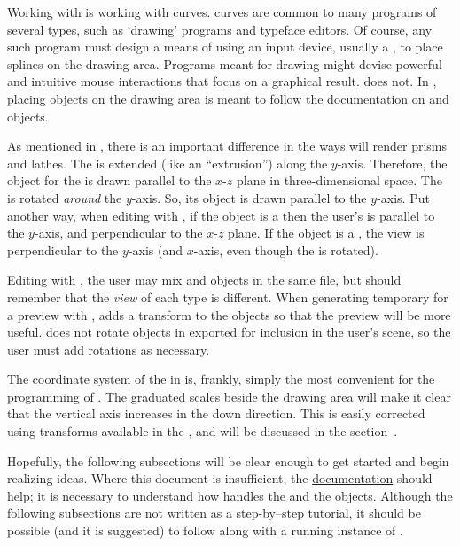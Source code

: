 	Working with \IXpkg{} is working with \IXspline{} curves.
	\IXSpline{} curves are common to many programs of
	several types, such as `drawing' programs and typeface
	editors. Of course, any such program must design a
	means of using an input device, usually a ,
	to place splines on the drawing area. Programs meant
	for drawing might devise powerful and intuitive mouse
	interactions that focus on a graphical result.
	\IXpkgu{} does not. In \IXpkg{}, placing \IXspline{}
	objects on the drawing area is meant to follow the
	\IXpov{} \href{\URLPOVdocs}{documentation}
	on
	\href{\URLPOVdocsLathe}{\IXlathe{}}
	and
	\href{\URLPOVdocsPrism}{\IXprism{}}
	objects.

	As mentioned in ,
	there is an important difference
	in the ways \IXpov{} will render prisms and lathes.
	The \IXprism{} is extended (like an ``extrusion'') along the
	$y$-axis. Therefore, the \IXspline{} object for the \IXprism{}
	is drawn parallel to the $x$-$z$ plane in three-dimensional space.
	The \IXlathe{} is rotated \emph{around} the $y$-axis. So, its
	\IXspline{} object is drawn parallel to the $y$-axis. Put another way,
	when editing with \IXpkg{}, if the object is a \IXprism{}
	then the user's  is parallel to the
	$y$-axis, and perpendicular to the $x$-$z$ plane. If the
	object is a \IXlathe{}, the view is perpendicular to the $y$-axis
	(and $x$-axis, even though the \IXlathe{} is rotated).
	
	Editing with \IXpkg{}, the user may mix \IXprism{} and \IXlathe{}
	objects in the same file, but should remember that the
	\emph{view} of each type is different. When generating
	temporary  for a preview with \IXpov{}, \IXpkg{}
	adds a  transform to the \IXprism{} objects
	so that the preview will be more useful. \IXpkgu{} does
	not rotate objects in  exported for
	inclusion in the user's scene, so the user must add
	rotations as necessary.
	
	The coordinate system of the  in \IXpkg{}
	is, frankly, simply the most convenient for the programming
	of \IXpkg{}. The graduated scales beside the drawing area
	will make it clear that the vertical axis increases
	in the down direction. This is easily corrected using
	transforms available in the , and will be discussed
	in the section~.

	Hopefully, the following subsections will be clear enough
	to get started and begin realizing ideas. Where
	this document is insufficient, the \IXpov{}
	\href{\URLPOVdocs}{documentation} should help;
	it is necessary to understand how \IXpov{} handles the
	\IXprism{} and the \IXlathe{} objects.
	Although the following subsections are not written as a
	step-by--step tutorial, it should be possible
	(and it is suggested) to follow along with a running
	instance of \IXpkg{}.

